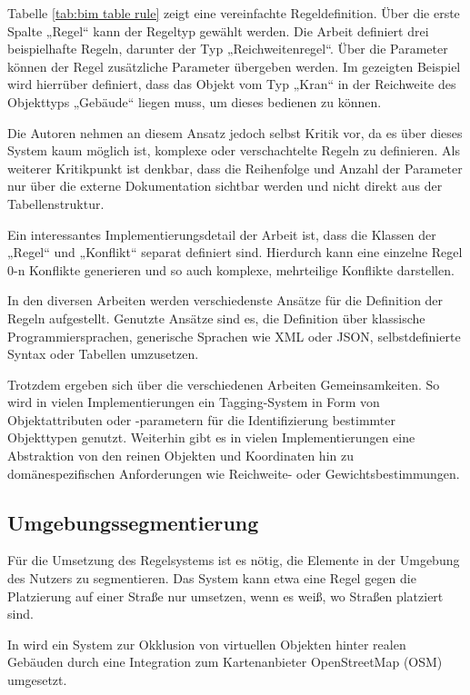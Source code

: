 Tabelle \ref{tab:bim table rule} zeigt eine vereinfachte Regeldefinition. Über die erste Spalte „Regel“ kann der Regeltyp gewählt werden. Die Arbeit definiert drei beispielhafte Regeln, darunter der Typ „Reichweitenregel“. Über die Parameter können der Regel zusätzliche Parameter übergeben werden. Im gezeigten Beispiel wird hierrüber definiert, dass das Objekt vom Typ „Kran“ in der Reichweite des Objekttyps „Gebäude“ liegen muss, um dieses bedienen zu können.

Die Autoren nehmen an diesem Ansatz jedoch selbst Kritik vor, da es über dieses System kaum möglich ist, komplexe oder verschachtelte Regeln zu definieren. Als weiterer Kritikpunkt ist denkbar, dass die Reihenfolge und Anzahl der Parameter nur über die externe Dokumentation sichtbar werden und nicht direkt aus der Tabellenstruktur. 

Ein interessantes Implementierungsdetail der Arbeit ist, dass die Klassen der „Regel“ und „Konflikt“ separat definiert sind. Hierdurch kann eine einzelne Regel 0-n Konflikte generieren und so auch komplexe, mehrteilige Konflikte darstellen.

\medskip

In den diversen Arbeiten werden verschiedenste Ansätze für die Definition der Regeln aufgestellt. Genutzte Ansätze sind es, die Definition über klassische Programmiersprachen, generische Sprachen wie XML oder JSON, selbstdefinierte Syntax oder Tabellen umzusetzen.

Trotzdem ergeben sich über die verschiedenen Arbeiten Gemeinsamkeiten. So wird in vielen Implementierungen ein Tagging-System in Form von Objektattributen oder -parametern für die Identifizierung bestimmter Objekttypen genutzt. Weiterhin gibt es in vielen Implementierungen eine Abstraktion von den reinen Objekten und Koordinaten hin zu domänespezifischen Anforderungen wie Reichweite- oder Gewichtsbestimmungen. 

\subsection{Umgebungssegmentierung}\label{subsection:Umgebungssegmentierung}

Für die Umsetzung des Regelsystems ist es nötig, die Elemente in der Umgebung des Nutzers zu segmentieren. Das System kann etwa eine Regel gegen die Platzierung auf einer Straße nur umsetzen, wenn es weiß, wo Straßen platziert sind.

In \textcite{kasperiOcclusionOutdoorAugmented2017} wird ein System zur Okklusion von virtuellen Objekten hinter realen Gebäuden durch eine Integration zum Kartenanbieter OpenStreetMap (OSM) umgesetzt.

